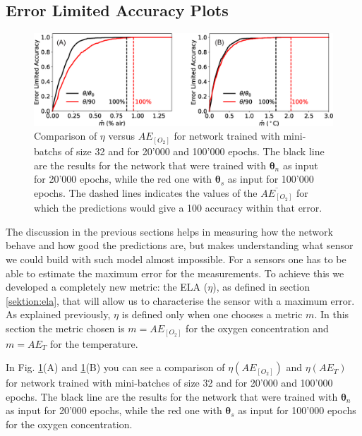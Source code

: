 \documentclass[9pt,twocolumn,twoside,pdftex]{optica}
\begin{document}
\subsection{Error Limited Accuracy Plots}

\begin{figure}[t!]
\centering
\includegraphics[width=15 cm]{ELA_comparison_O2_T.eps}
\caption{Comparison of $\eta$ versus $AE_{[O_2]}$ for network trained with mini-batchs of size 32 and for 20'000 and 100'000 epochs. The black line are the results for the network that were trained with ${\pmb \theta}_n$ as input for 20'000 epochs, while the red one with ${\pmb \theta}_s$ as input for 100'000 epochs. The dashed lines indicates the values of the $\overline{AE_{[O_2]}}$ for which the predictions would give a 100 accuracy within that error.}
\label{fig:ELA_result_comparison}
\end{figure}


The discussion in the previous sections helps in measuring how the network behave and how good the predictions are, but makes understanding what sensor we could build with such model almost impossible. For a sensors one has to be able to estimate the maximum error for the measurements. To achieve this we developed a completely new metric: the ELA ($\eta$), as defined in section \ref{sektion:ela}, that will allow us to characterise the sensor with a maximum error. As explained previously, $\eta$ is defined only when one chooses a metric $m$. In this section the metric chosen is $m=AE_{[O_2]}$ for the oxygen concentration and $m=AE_{T}$ for the temperature.



In Fig. \ref{fig:ELA_result_comparison}(A) and \ref{fig:ELA_result_comparison}(B) you can see a comparison of $\eta(AE_{[O_2]})$ and $\eta(AE_{T})$ for network trained with mini-batches of size 32 and for 20'000 and 100'000 epochs. The black line are the results for the network that were trained with ${\pmb \theta}_n$ as input for 20'000 epochs, while the red one with ${\pmb \theta}_s$ as input for 100'000 epochs for the oxygen concentration.
\end{document}
